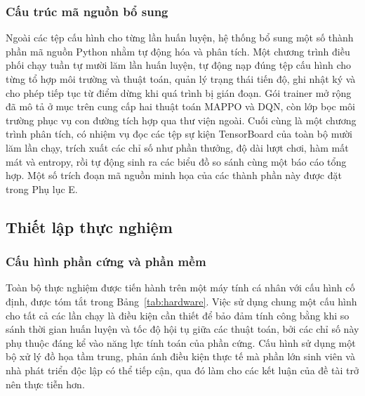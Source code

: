 \subsubsection{Cấu trúc mã nguồn bổ sung}
\label{sub:codestruct}
\indent Ngoài các tệp cấu hình cho từng lần huấn luyện, hệ thống bổ sung một số thành
phần mã nguồn Python nhằm tự động hóa và phân tích. Một chương
trình điều phối chạy tuần tự mười lăm lần huấn luyện, tự động nạp đúng tệp cấu hình cho
từng tổ hợp môi trường và thuật toán, quản lý trạng thái tiến độ, ghi nhật ký và cho
phép tiếp tục từ điểm dừng khi quá trình bị gián đoạn. Gói trainer mở rộng đã mô tả ở
mục trên cung cấp hai thuật toán MAPPO và DQN, còn lớp bọc môi trường phục vụ con đường
tích hợp qua thư viện ngoài. Cuối cùng là một
chương trình phân tích, có nhiệm vụ đọc các tệp sự kiện TensorBoard của toàn bộ mười
lăm lần chạy, trích xuất các chỉ số như phần thưởng, độ dài lượt chơi, hàm mất mát và
entropy, rồi tự động sinh ra các biểu đồ so sánh cùng một báo cáo tổng hợp. Một số
trích đoạn mã nguồn minh họa của các thành phần này được đặt trong Phụ lục E.

\subsection{Thiết lập thực nghiệm}
\label{sub:experiment-setup}

\subsubsection{Cấu hình phần cứng và phần mềm}
\label{sub:hardware}
\indent Toàn bộ thực nghiệm được tiến hành trên một máy tính cá nhân với cấu hình cố
định, được tóm tắt trong Bảng~\ref{tab:hardware}. Việc sử dụng chung một cấu hình cho
tất cả các lần chạy là điều kiện cần thiết để bảo đảm tính công bằng khi so sánh thời
gian huấn luyện và tốc độ hội tụ giữa các thuật toán, bởi các chỉ số này phụ thuộc
đáng kể vào năng lực tính toán của phần cứng. Cấu hình sử dụng một bộ xử lý đồ họa tầm
trung, phản ánh điều kiện thực tế mà phần lớn sinh viên và nhà phát triển độc lập có
thể tiếp cận, qua đó làm cho các kết luận của đề tài trở nên thực tiễn hơn.

